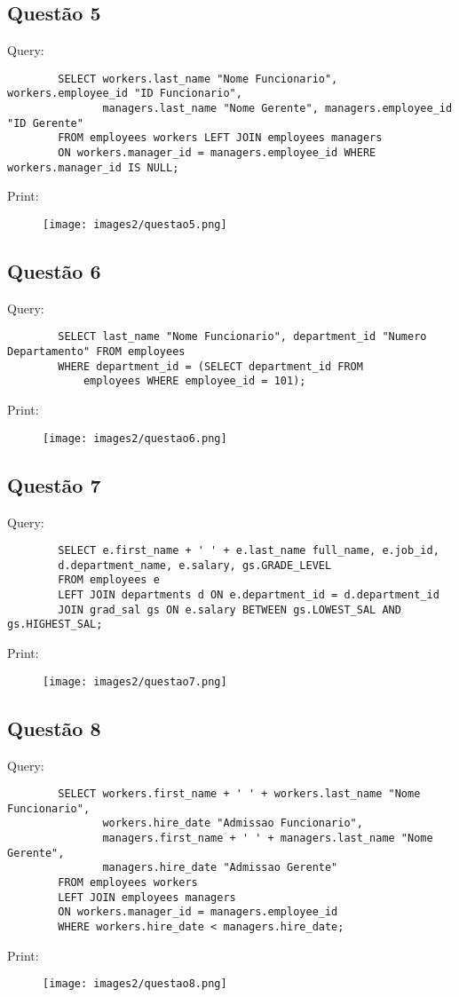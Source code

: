 \documentclass{article}[twocolumn]
\begin{document}
	\subsection{Quest\~ao 5}
	Query:
	\begin{verbatim}
		SELECT workers.last_name "Nome Funcionario", workers.employee_id "ID Funcionario",
		       managers.last_name "Nome Gerente", managers.employee_id "ID Gerente"
		FROM employees workers LEFT JOIN employees managers
		ON workers.manager_id = managers.employee_id WHERE workers.manager_id IS NULL;
	\end{verbatim}
	Print:
	\begin{figure}[H]
		\centering
		\texttt{[image: images2/questao5.png]}
	\end{figure}
	\newpage
	\subsection{Quest\~ao 6}
	Query:
	\begin{verbatim}
		SELECT last_name "Nome Funcionario", department_id "Numero Departamento" FROM employees
		WHERE department_id = (SELECT department_id FROM
		    employees WHERE employee_id = 101);
	\end{verbatim}
	Print:
	\begin{figure}[H]
		\centering
		\texttt{[image: images2/questao6.png]}
	\end{figure}
	\newpage
	\subsection{Quest\~ao 7}
	Query:
	\begin{verbatim}
		SELECT e.first_name + ' ' + e.last_name full_name, e.job_id,
		d.department_name, e.salary, gs.GRADE_LEVEL
		FROM employees e
		LEFT JOIN departments d ON e.department_id = d.department_id
		JOIN grad_sal gs ON e.salary BETWEEN gs.LOWEST_SAL AND gs.HIGHEST_SAL;
	\end{verbatim}
	Print:
	\begin{figure}[H]
		\centering
		\texttt{[image: images2/questao7.png]}
	\end{figure}
	\newpage
	\subsection{Quest\~ao 8}
	Query:
	\begin{verbatim}
		SELECT workers.first_name + ' ' + workers.last_name "Nome Funcionario",
		       workers.hire_date "Admissao Funcionario",
		       managers.first_name + ' ' + managers.last_name "Nome Gerente",
		       managers.hire_date "Admissao Gerente"
		FROM employees workers
		LEFT JOIN employees managers
		ON workers.manager_id = managers.employee_id
		WHERE workers.hire_date < managers.hire_date;
	\end{verbatim}
	Print:
	\begin{figure}[H]
		\centering
		\texttt{[image: images2/questao8.png]}
	\end{figure}
	\newpage
\end{document}
